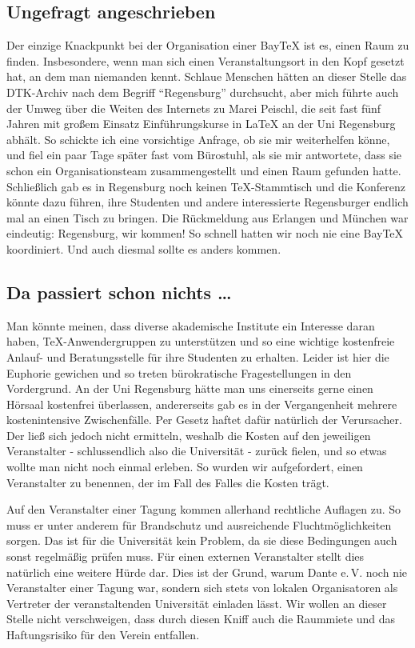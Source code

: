 \documentclass[ngerman]{dtk}
\begin{document}
\subsection{Ungefragt angeschrieben}
Der einzige Knackpunkt bei der Organisation einer Bay\TeX{} ist es, einen Raum zu finden.
Insbesondere, wenn man sich einen Veranstaltungsort in den Kopf gesetzt hat, an dem man niemanden kennt.
Schlaue Menschen hätten an dieser Stelle das DTK-Archiv nach dem Begriff \enquote{Regensburg} durchsucht,
aber mich führte auch der Umweg über die Weiten des Internets zu Marei Peischl,
die seit fast fünf Jahren mit großem Einsatz Einführungskurse in \LaTeX{} an der Uni Regensburg abhält.
So schickte ich eine vorsichtige Anfrage, ob sie mir weiterhelfen könne,
und fiel ein paar Tage später fast vom Bürostuhl, als sie mir antwortete,
dass sie schon ein Organisationsteam zusammengestellt und einen Raum gefunden hatte.
Schließlich gab es in Regensburg noch keinen \TeX{}-Stammtisch und die Konferenz
könnte dazu führen, ihre Studenten und andere interessierte Regensburger
endlich mal an einen Tisch zu bringen.
Die Rückmeldung aus Erlangen und München war eindeutig: Regensburg, wir kommen!
So schnell hatten wir noch nie eine Bay\TeX{} koordiniert. Und auch diesmal sollte es anders kommen.

\subsection{Da passiert schon nichts \ldots}
Man könnte meinen, dass diverse akademische Institute ein Interesse daran haben,
\TeX{}-Anwendergruppen zu unterstützen und so eine wichtige kostenfreie
Anlauf- und Beratungsstelle für ihre Studenten zu erhalten.
Leider ist hier die Euphorie gewichen und so treten bürokratische Fragestellungen
in den Vordergrund. An der Uni Regensburg hätte man uns einerseits gerne einen Hörsaal kostenfrei überlassen,
andererseits gab es in der Vergangenheit mehrere kostenintensive Zwischenfälle.
Per Gesetz haftet dafür natürlich der Verursacher.
Der ließ sich jedoch nicht ermitteln, weshalb die Kosten auf den jeweiligen Veranstalter - schlussendlich also die Universität - zurück fielen, und so etwas wollte man nicht noch einmal erleben.
So wurden wir aufgefordert, einen Veranstalter zu benennen, der im Fall des Falles die Kosten trägt.

Auf den Veranstalter einer Tagung kommen allerhand rechtliche Auflagen zu.
So muss er unter anderem für Brandschutz und ausreichende Fluchtmöglichkeiten sorgen.
Das ist für die Universität kein Problem,
da sie diese Bedingungen auch sonst regelmäßig prüfen muss.
Für einen externen Veranstalter stellt dies natürlich eine weitere Hürde dar.
Dies ist der Grund, warum Dante e.\,V. noch nie Veranstalter
einer Tagung war, sondern sich stets von lokalen Organisatoren als Vertreter der veranstaltenden Universität einladen lässt.
Wir wollen an dieser Stelle nicht verschweigen, dass durch diesen Kniff auch die Raummiete und das Haftungsrisiko für den Verein entfallen.
\end{document}
